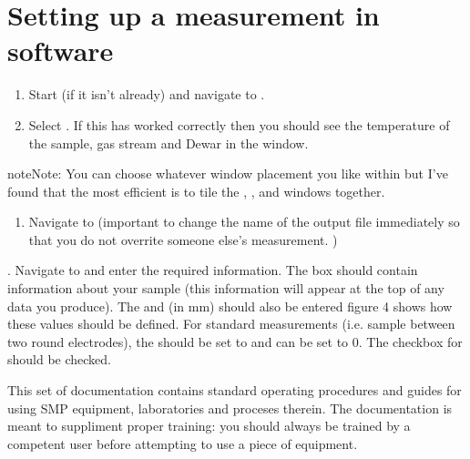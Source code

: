 \documentclass[letterpaper,10pt,english]{sphinxmanual}
\begin{document}
\section{Setting up a measurement in software}
\label{\detokenize{novocontrol-dielectric:setting-up-a-measurement-in-software}}\begin{enumerate}
%
\item {} 
\sphinxAtStartPar
Start  (if it isn’t already) and navigate to .

\item {} 
\sphinxAtStartPar
Select . If this has worked correctly then you should see the temperature of the sample, gas stream and Dewar in the  window.

\end{enumerate}

\begin{sphinxadmonition}{note}{Note:}
\sphinxAtStartPar
You can choose whatever window placement you like within  but I’ve found that the most efficient is to tile the , ,  and  windows together.
\end{sphinxadmonition}
\begin{enumerate}
%
\setcounter{enumi}{2}
\item {} 
\sphinxAtStartPar
Navigate to  (important to change the name of the output file immediately so that you do not overrite someone else’s measurement. )

\end{enumerate}

. Navigate to  and enter the required information. The  box should contain information about your
sample (this information will appear at the top of any data you produce). The  and  (in mm) should also be entered \sphinxhyphen{} figure 4 shows how these values should be defined. For standard measurements (i.e. sample between two round electrodes), the  should be set to  and  can be set to 0. The checkbox for  should be checked.

\sphinxAtStartPar
This set of documentation contains standard operating procedures and guides for using SMP equipment, laboratories and proceses therein.
The documentation is  meant to suppliment proper training: you should always be trained by a competent user before attempting to use a piece of equipment.



\renewcommand{\indexname}{Index}
\printindex
\end{document}
